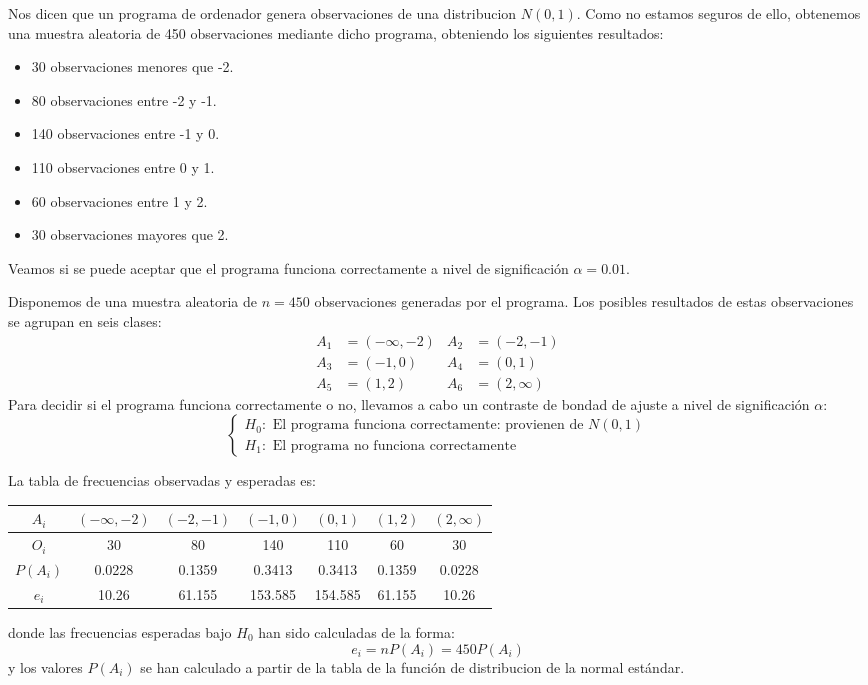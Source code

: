 \begin{example}
    Nos dicen que un programa de ordenador genera observaciones de una distribucion $N(0, 1)$.
    Como no estamos seguros de ello, obtenemos una muestra aleatoria de 450 observaciones mediante dicho programa, obteniendo los siguientes resultados:
    \begin{itemize}
        \item 30 observaciones menores que -2.
        \item 80 observaciones entre -2 y -1.
        \item 140 observaciones entre -1 y 0.
        \item 110 observaciones entre 0 y 1.
        \item 60 observaciones entre 1 y 2.
        \item 30 observaciones mayores que 2.
    \end{itemize}
    Veamos si se puede aceptar que el programa funciona correctamente a nivel de significación $\alpha = 0.01$.

    Disponemos de una muestra aleatoria de $n = 450$ observaciones generadas por el programa.
    Los posibles resultados de estas observaciones se agrupan en seis clases:
    \begin{align*}
        A_1 & = (-\infty, -2) & A_2 & = (-2, -1)    \\
        A_3 & = (-1, 0)       & A_4 & = (0, 1)      \\
        A_5 & = (1, 2)        & A_6 & = (2, \infty)
    \end{align*}
    Para decidir si el programa funciona correctamente o no, llevamos a cabo un contraste de bondad de ajuste a nivel de significación $\alpha$:
    $$\begin{cases}
            H_0: \text{ El programa funciona correctamente: provienen de } N(0, 1) \\
            H_1: \text{ El programa no funciona correctamente}
        \end{cases}$$

    La tabla de frecuencias observadas y esperadas es:
    \begin{center}
        \begin{tabular}{| c | c c c c c c |}
            \hline
            $A_i$    & $(-\infty, -2)$ & $(-2, -1)$ & $(-1, 0)$ & $(0, 1)$ & $(1, 2)$ & $(2, \infty)$ \\
            \hline
            $O_i$    & 30              & 80         & 140       & 110      & 60       & 30            \\
            $P(A_i)$ & 0.0228          & 0.1359     & 0.3413    & 0.3413   & 0.1359   & 0.0228        \\
            $e_i$    & 10.26           & 61.155     & 153.585   & 154.585  & 61.155   & 10.26         \\
            \hline
        \end{tabular}
    \end{center}
    donde las frecuencias esperadas bajo $H_0$ han sido calculadas de la forma:
    $$e_i = nP(A_i) = 450P(A_i)$$
    y los valores $P(A_i)$ se han calculado a partir de la tabla de la función de distribucion de la normal estándar.


\end{example}
